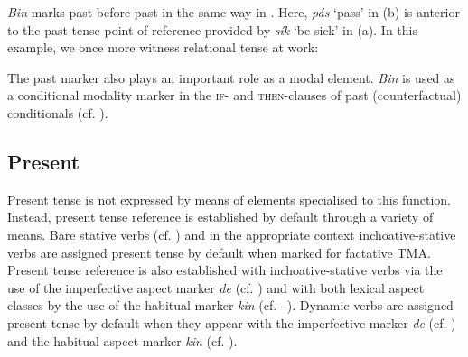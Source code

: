 \textit{Bin} marks past-before-past in the same way in . Here, \textit{pás} ‘pass’ in (b) is anterior to the past tense point of reference provided by \textit{sík} ‘be sick’ in (a). In this example, we once more witness relational tense at work:


\ea%
    \label{ex:key:385}
\z
\z

The past marker also plays an important role as a modal element. \textit{Bin} is used as a conditional modality marker in the \textsc{if-} and \textsc{then-}clauses of past (counterfactual) conditionals (cf. ).

\subsection{Present}\label{sec:6.5.3}

Present tense is not expressed by means of elements specialised to this function. Instead, present tense reference is established by default through a variety of means. Bare stative verbs (cf. ) and in the appropriate context inchoative-stative verbs  are assigned present tense by default when marked for factative TMA. Present tense reference is also established with inchoative-stative verbs via the use of the imperfective aspect marker \textit{de} (cf. ) and with both lexical aspect classes by the use of the habitual marker \textit{kin} (cf. –). Dynamic verbs are assigned present tense by default when they appear with the imperfective marker \textit{de} (cf. ) and the habitual aspect marker \textit{kin} (cf. ). 

